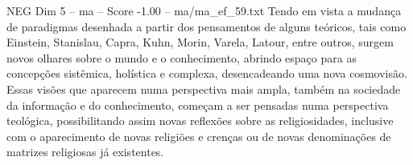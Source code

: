 \begin{textsample}{NEG Dim 5 – ma – Score -1.00 – ma/ma\_ef\_59.txt}
Tendo em vista a mudança de paradigmas desenhada a partir dos pensamentos de alguns teóricos, tais como Einstein, Stanislau, Capra, Kuhn, Morin, Varela, Latour, entre outros, surgem novos olhares sobre o mundo e o conhecimento, abrindo espaço para as concepções sistêmica, holística e complexa, desencadeando uma nova cosmovisão.
Essas visões que aparecem numa perspectiva mais ampla, também na sociedade da informação e do conhecimento, começam a ser pensadas numa perspectiva teológica, possibilitando assim novas reflexões sobre as religiosidades, inclusive com o aparecimento de novas religiões e crenças ou de novas denominações de matrizes religiosas já existentes.

\end{textsample}
